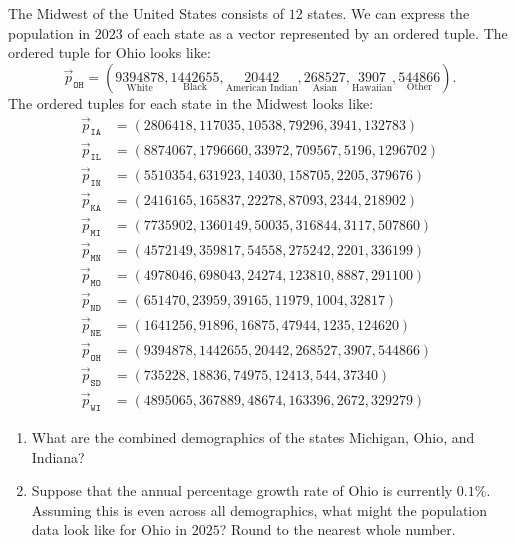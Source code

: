 \documentclass{ximera}
\begin{document}
\begin{example} %
  The Midwest of the United States consists of $12$ states. We can
  express the population in $2023$
  of each state as a vector represented by an ordered tuple. The
  ordered tuple for Ohio looks like:
  \[
  \vec{p}_{\texttt{OH}} = (\underset{\text{White}}{9394878},\underset{\text{Black}}{1442655},\underset{\text{American Indian}}{20442},\underset{\text{Asian}}{268527},\underset{\text{Hawaiian}}{3907},\underset{\text{Other}}{544866}).
  \]
  The ordered tuples for each state in the Midwest looks like:
\begin{align*}
  \vec{p}_{\texttt{IA}} &= (2806418,117035,10538,79296,3941,132783)\\
  \vec{p}_{\texttt{IL}} &= (8874067,1796660,33972,709567,5196,1296702)\\
  \vec{p}_{\texttt{IN}} &= (5510354,631923,14030,158705,2205,379676)\\
  \vec{p}_{\texttt{KA}} &= (2416165,165837,22278,87093,2344,218902)\\
  \vec{p}_{\texttt{MI}} &= (7735902,1360149,50035,316844,3117,507860)\\
  \vec{p}_{\texttt{MN}} &= (4572149,359817,54558,275242,2201,336199)\\
  \vec{p}_{\texttt{MO}} &= (4978046,698043,24274,123810,8887,291100)\\
  \vec{p}_{\texttt{ND}} &= (651470,23959,39165,11979,1004,32817)\\
  \vec{p}_{\texttt{NE}} &= (1641256,91896,16875,47944,1235,124620)\\
  \vec{p}_{\texttt{OH}} &= (9394878,1442655,20442,268527,3907,544866)\\
  \vec{p}_{\texttt{SD}} &= (735228,18836,74975,12413,544,37340)\\
  \vec{p}_{\texttt{WI}} &= (4895065,367889,48674,163396,2672,329279)
\end{align*}
\begin{enumerate}
\item What are the combined demographics of the states Michigan, Ohio,
  and Indiana?
\item Suppose that the annual percentage growth rate of Ohio is
  currently $0.1\%$. Assuming this is even across all demographics,
  what might the population data look like for Ohio in $2025$? Round
  to the nearest whole number.
\end{enumerate}

\end{example}
\end{document}
